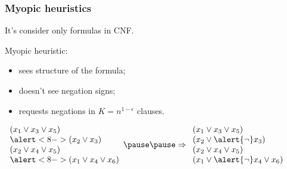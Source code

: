 \begin{frame}
	\frametitle{Myopic heuristics}
    \pause

    It's consider only formulas in CNF.

    \pause
    \begin{definition}
        Myopic heuristic:
        \pause
        \begin{itemize}
	        \item sees structure of the formula;
        	\pause
        	\item doesn't see negation signs;
        	\item<6-> requests negations in $K = n^{1 - \epsilon}$ clauses.
        \end{itemize}
    \end{definition}

    \pause
    \pause
    $\begin{array}{l}
        (x_1 \vee x_3 \vee x_5) \\
        \alert<8->{(x_2 \vee x_3)} \\
        (x_2 \vee x_4 \vee x_5) \\
        \alert<8->{(x_1 \vee x_4 \vee x_6)} \\
    \end{array}
    \pause
    \pause
    \Rightarrow
    \begin{array}{l}
        (x_1 \vee x_3 \vee x_5) \\
        (x_2 \vee \alert{\neg} x_3) \\
        (x_2 \vee x_4 \vee x_5) \\
        (x_1 \vee \alert{\neg} x_4 \vee x_6) \\
    \end{array}$
    
\end{frame}


